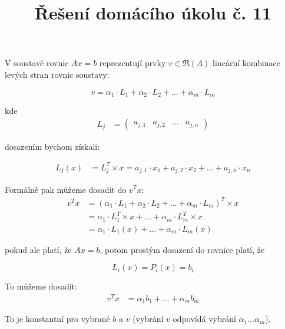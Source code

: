 \documentclass[10pt,a4paper]{article}
\title{Řešení domácího úkolu č. 11}
\date{}
\begin{document}
\maketitle

\section{} 

V soustavě rovnic $Ax = b$ reprezentují prvky $v \in \mathfrak{R}(A)$ lineární kombinace levých stran rovnic soustavy:

\begin{equation*} 
v = \alpha_1 \cdot L_1 + \alpha_2 \cdot L_2 + ... + \alpha_m \cdot L_m
\end{equation*}

kde 
\begin{align*}
L_j &= \begin{pmatrix}
a_{j,1} & a_{j,2}& ... & a_{j,n}
\end{pmatrix} 
\end{align*}

dosazením bychom získali:

\begin{align*}
L_j(x) &= L_j^T \times x = a_{j,1} \cdot x_1 + a_{j,2} \cdot x_2 + ... + a_{j,n} \cdot x_n
\end{align*}

Formálně pak můžeme dosadit do $v^Tx$:
\begin{align*}
v^Tx &= ( \alpha_1 \cdot L_1 + \alpha_2 \cdot L_2 + ... + \alpha_m \cdot L_m)^T \times x \\
&= \alpha_1 \cdot L_1^T \times x + ... + \alpha_m \cdot L^T_m\times x \\
&= \alpha_1 \cdot L_1(x) + ... + \alpha_m \cdot L_m(x)
\end{align*}

pokud ale platí, že $Ax = b$, potom prostým dosazení do rovnice platí, že

\begin{equation*}
L_i(x) = P_i(x) = b_i
\end{equation*}

To můžeme dosadit:
\begin{align*}
v^Tx &= \alpha_1 b_1 + ... + \alpha_m b_m
\end{align*}

To je konstantní pro vybrané $b$ a $v$ (vybrání $v$ odpovídá vybrání $\alpha_1 ... \alpha_m$).

\pagebreak
\end{document}
